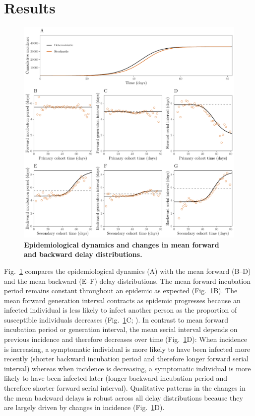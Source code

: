 \documentclass[12pt]{article}
\newcommand{\fref}[1]{Fig.~\ref{fig:#1}}
\begin{document}
\section{Results}

\begin{figure}[!ht]
\includegraphics[width=\textwidth]{forward.pdf}
\caption{
\textbf{Epidemiological dynamics and changes in mean forward and backward delay distributions.}
}
\label{fig:epi}
\end{figure}

\fref{epi} compares the epidemiological dynamics (A) with the mean forward (B--D) and the mean backward (E--F) delay distributions.
The mean forward incubation period remains constant throughout an epidemic as expected (\fref{epi}B).
The mean forward generation interval contracts as epidemic progresses because an infected individual is less likely to infect another person as the proportion of susceptible individuals decreases (\fref{epi}C; \cite{champredon2015intrinsic}).
In contrast to mean forward incubation period or generation interval, the mean serial interval depends on previous incidence and therefore decreases over time (\fref{epi}D):
When incidence is increasing, a symptomatic individual is more likely to have been infected more recently (shorter backward incubation period and therefore longer forward serial interval) whereas when incidence is decreasing, a symptomatic individual is more likely to have been infected later (longer backward incubation period and therefore shorter forward serial interval).
Qualitative patterns in the changes in the mean backward delays is robust across all delay distributions because they are largely driven by changes in incidence (\fref{epi}D).
\end{document}

